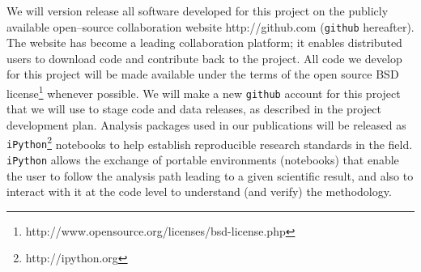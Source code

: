 We will version release all software developed for this project on the
publicly available open--source collaboration website
http://github.com ({\tt github} hereafter).  The website has become a
leading collaboration platform; it enables distributed users to
download code and contribute back to the project.  All code we develop
for this project will be made available under the terms of the open
source BSD
license\footnote{http://www.opensource.org/licenses/bsd-license.php}
whenever possible.  We will make a new {\tt github} account for this
project that we will use to stage code and data releases, as described
in the project development plan.  Analysis packages used in our
publications will be released as {\tt
iPython}\footnote{http://ipython.org} notebooks to help establish
reproducible research standards in the field.  {\tt iPython} allows
the exchange of portable environments (notebooks) that enable the user
to follow the analysis path leading to a given scientific result, and
also to interact with it at the code level to understand (and verify)
the methodology.


